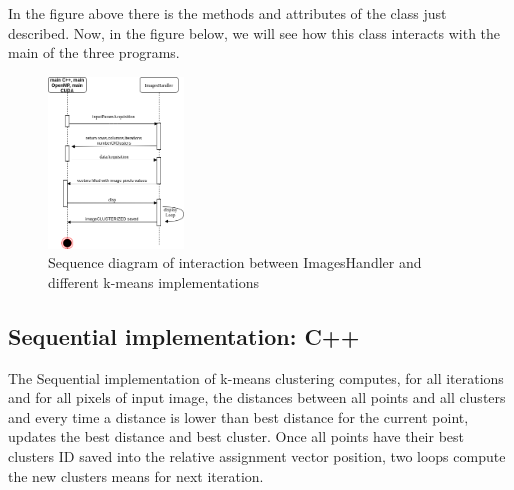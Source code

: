 \documentclass[10pt,twocolumn,letterpaper]{article}
\begin{document}
In the figure above there is the methods and attributes of the class just described. 
Now, in the figure below, we will see how this class interacts with the main of the three programs.
\begin{figure}[H]
\begin{center}
\includegraphics[width=0.32\textwidth]{latex/ImageHandlerIteractions.png}
\caption{Sequence diagram of interaction between ImagesHandler and different k-means implementations}
\label{etichetta}
\end{center}
\end{figure}

\newpage
\subsection{Sequential implementation: C++}

The Sequential implementation of k-means clustering computes, for all iterations and for all pixels of input image, the distances between all points and all clusters and every time a distance is lower than  best distance for the current point, updates the best distance and best cluster. Once all points have their best clusters ID saved into the relative assignment vector position, two loops compute the new clusters means for next iteration.
\end{document}
